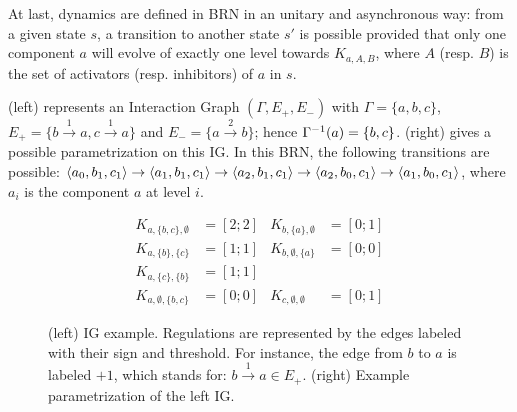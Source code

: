 At last, dynamics are defined in BRN in an unitary and asynchronous way:
from a given state $s$, a transition to another state $s'$ is possible provided that only one component $a$ will evolve of exactly one level towards $K_{a,A,B}$, where $A$ (resp. $B$) is the set of activators (resp. inhibitors) of $a$ in $s$.

\begin{example*}
(left) represents an Interaction Graph $(\Gamma,E_+,E_-)$ with
$\Gamma = \{a, b, c\}$,
$E_+ = \{b \xrightarrow{1} a, c \xrightarrow{1} a\}$ and
$E_- = \{a \xrightarrow{2} b\}$;
hence $\Gamma^{-1}(a) = \{b, c\}$.
(right) gives a possible parametrization on this IG.
In this BRN, the following transitions are possible:
$\mbox{$\langle a_0, b_1, c_1 \rangle$} \rightarrow \mbox{$\langle a_1, b_1, c_1 \rangle$} \rightarrow \mbox{$\langle a_2, b_1, c_1 \rangle$} \rightarrow
\mbox{$\langle a_2, b_0, c_1 \rangle$} \rightarrow \mbox{$\langle a_1, b_0, c_1 \rangle$}$,
where $a_i$ is the component $a$ at level $i$.
\end{example*}

\begin{figure}[t]
\begin{minipage}{0.4\linewidth}
\centering
{}
\end{minipage}
\begin{minipage}{0.6\linewidth}
\centering
\begin{align*}
K_{a,\{b,c\},\emptyset} &= [2 ; 2] & K_{b,\{a\},\emptyset} &= [0 ; 1] \\
K_{a,\{b\},\{c\}} &= [1 ; 1] & K_{b,\emptyset,\{a\}} &= [0 ; 0] \\
K_{a,\{c\},\{b\}} &= [1 ; 1] &&\\
K_{a,\emptyset,\{b,c\}} &= [0 ; 0] & K_{c,\emptyset,\emptyset} &= [0 ; 1]
\end{align*}
\end{minipage}
\caption{\label{fig:runningBRN}
(left)
IG example.
Regulations are represented by the edges labeled with their sign and threshold.
For instance, the edge from $b$ to $a$ is labeled $+1$, which stands for: $b \xrightarrow{1} a \in
E_+$.
(right)
Example parametrization of the left IG.
}
\end{figure}
